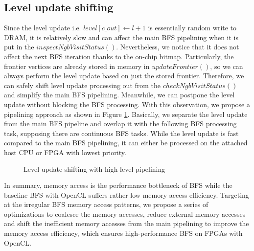 \subsection{Level update shifting}
Since the level update i.e. $level[c\_out] \gets l + 1$ is essentially random 
write to DRAM, it is relatively slow and can affect the main BFS pipelining 
when it is put in the $inspectNgbVisitStatus()$. Nevertheless, we notice that
it does not affect the next BFS iteration thanks to the on-chip bitmap.
Particularly, the frontier vertices are already stored in memory in $updateFrontier()$, 
so we can always perform the level update based on just the stored frontier.
Therefore, we can safely shift level update processing out from 
the $checkNgbVisitStatus()$ and simplify the main BFS pipelining.
Meanwhile, we can postpone the level update without blocking the BFS processing.
With this observation, we propose a pipelining approach as shown in 
Figure \ref{fig:hyper}. Basically, we separate the level update from the 
main BFS pipeline and overlap it with the following BFS processing task, 
supposing there are continuous BFS tasks. While the level update is fast 
compared to the main BFS pipelining, it can either be processed on the 
attached host CPU or FPGA with lowest priority. 
\begin{figure}
	\caption{Level update shifting with high-level pipelining}
\label{fig:hyper}
\vspace{-1.2em}
\end{figure}

In summary, memory access is the performance bottleneck of BFS while the baseline 
BFS with OpenCL suffers rather low memory access efficiency. Targeting at 
the irregular BFS memory access patterns, we propose a series of optimizations to 
coalesce the memory accesses, reduce external memory accesses and shift the 
inefficient memory accesses from the main pipelining to improve the memory 
access efficiency, which ensures high-performance BFS on FPGAs with OpenCL.


